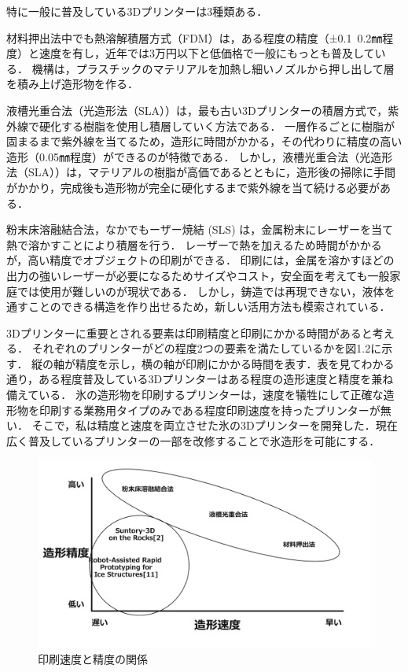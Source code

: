 特に一般に普及している3Dプリンターは3種類ある．

材料押出法中でも熱溶解積層方式（FDM）は，ある程度の精度（±0.1~0.2㎜程度）と速度を有し，近年では3万円以下と低価格で一般にもっとも普及している．
機構は，プラスチックのマテリアルを加熱し細いノズルから押し出して層を積み上げ造形物を作る．


液槽光重合法（光造形法（SLA））は，最も古い3Dプリンターの積層方式で，紫外線で硬化する樹脂を使用し積層していく方法である．
一層作るごとに樹脂が固まるまで紫外線を当てるため，造形に時間がかかる，その代わりに精度の高い造形（0.05㎜程度）ができるのが特徴である．
しかし，液槽光重合法（光造形法（SLA））は，マテリアルの樹脂が高価であるとともに，造形後の掃除に手間がかかり，完成後も造形物が完全に硬化するまで紫外線を当て続ける必要がある．


粉末床溶融結合法，なかでもーザー焼結 (SLS) は，金属粉末にレーザーを当て熱で溶かすことにより積層を行う．
レーザーで熱を加えるため時間がかかるが，高い精度でオブジェクトの印刷ができる．
印刷には，金属を溶かすほどの出力の強いレーザーが必要になるためサイズやコスト，安全面を考えても一般家庭では使用が難しいのが現状である．
しかし，鋳造では再現できない，液体を通すことのできる構造を作り出せるため，新しい活用方法も模索されている．


3Dプリンターに重要とされる要素は印刷精度と印刷にかかる時間があると考える．
それぞれのプリンターがどの程度2つの要素を満たしているかを図1.2に示す．
縦の軸が精度を示し，横の軸が印刷にかかる時間を表す．表を見てわかる通り，ある程度普及している3Dプリンターはある程度の造形速度と精度を兼ね備えている．
氷の造形物を印刷するプリンターは，速度を犠牲にして正確な造形物を印刷する業務用タイプのみである程度印刷速度を持ったプリンターが無い．
そこで，私は精度と速度を両立させた氷の3Dプリンターを開発した．現在広く普及しているプリンターの一部を改修することで氷造形を可能にする．

\begin{figure}[H]
  \centering
  \includegraphics[width=14truecm]{./fig/hyou.jpg}
  \caption{印刷速度と精度の関係}
  \label{fig:ferret}
\end{figure}

